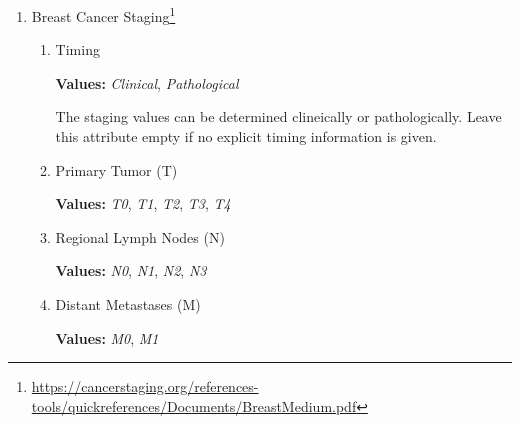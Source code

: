 \documentclass[letterpaper]{article}
\newcommand{\prefixDeep}[3]{%
  #1 %
  \tikz[baseline={([yshift={-\ht\strutbox}]a\x.north)},outer sep=0pt,inner sep=0pt]{%
    \node[align=center] (a\x) {%
      \strut \hl{#2}};%
  } %
  #3
}
\newcommand{\suffixDeep}{%
  \tikz[overlay]{ \draw[<->,thick] (b\x.west) -| (a\x.south); }%
  \pgfmathparse{int(\x+1)}%
  \xdef\x{\pgfmathresult}%
}
\newcommand{\threeDeep}[6]{%
  \begin{flushright}
  \tikz{
    \node[attrbox,align=right] (b\x) {%
      #1:  #2\\%
      #3:  #4\\%
      #5:  #6%
    };%
  }
  \end{flushright}
  \suffixDeep
}
\newcommand{\fiveDeep}[9]{%
  \begin{flushright}
  \tikz{
    \node[attrbox,align=right] (b\x) {%
      #1:  #2\\%
      #3:  #4\\%
      #5:  #6\\%
      #7:  #8\\%
      Historical:  #9%
    };%
  }
  \end{flushright}
  \suffixDeep
}
\newcommand{\erStatus}[5]{\fiveDeep{ER Status}{#1}{ER Positivity}{#2}{Allred Status}{#3}{Allred Score}{#4}{#5}}
\newcommand{\prStatus}[5]{\fiveDeep{PR Status}{#1}{PR Positivity}{#2}{Allred Status}{#3}{Allred Score}{#4}{#5}}
\newcommand{\herStatus}[3]{\threeDeep{HER2 Status}{#1}{HER2 Positivity}{#2}{Historical}{#3}}
\begin{document}
\begin{enumerate}
  
\item
  Breast Cancer Staging\footnote{\url{https://cancerstaging.org/references-tools/quickreferences/Documents/BreastMedium.pdf}}

  \begin{enumerate}
  \item
    Timing

    \textbf{Values:}  \textsl{Clinical}, \textsl{Pathological}

    The staging values can be determined clineically or pathologically.
    Leave this attribute empty if no explicit timing information is given.
    
  \item
    Primary Tumor (T)

    \textbf{Values:}  \textsl{T0}, \textsl{T1}, \textsl{T2}, \textsl{T3}, \textsl{T4}
    
  \item
    Regional Lymph Nodes (N)

    \textbf{Values:}  \textsl{N0}, \textsl{N1}, \textsl{N2}, \textsl{N3}

  \item
    Distant Metastases (M)

    \textbf{Values:}  \textsl{M0}, \textsl{M1}
    

\end{enumerate}
\end{enumerate}
\end{document}
